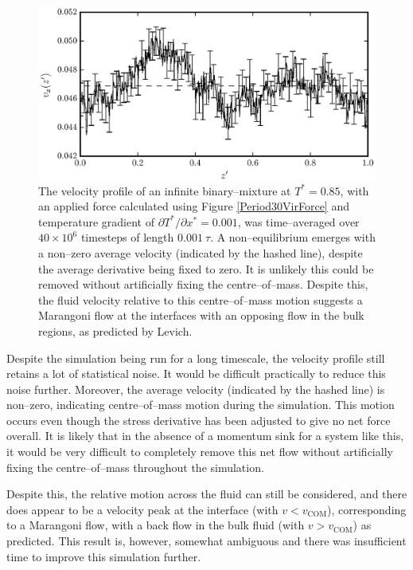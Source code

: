 \begin{figure}[h]
\centering
\includegraphics[scale=0.8]{Period30VirFlow}
\caption{The velocity profile of an infinite binary--mixture at $T^{*}=0.85$, with an applied force calculated using Figure \ref{Period30VirForce} and temperature gradient of $\partial T^{*} / \partial x^{*} = 0.001$, was time--averaged over $40 \times 10^{6}$ timesteps of length $0.001\ \tau$.
A non--equilibrium emerges with a non--zero average velocity (indicated by the hashed line), despite the average derivative being fixed to zero.
It is unlikely this could be removed without artificially fixing the centre--of--mass.
Despite this, the fluid velocity relative to this centre--of--mass motion suggests a Marangoni flow at the interfaces with an opposing flow in the bulk regions, as predicted by Levich.\cite{Levich}
}
\label{Period30VirFlow}
\end{figure}

Despite the simulation being run for a long timescale, the velocity profile still retains a lot of statistical noise.
It would be difficult practically to reduce this noise further.
Moreover, the average velocity (indicated by the hashed line) is non--zero, indicating centre--of--mass motion during the simulation.
This motion occurs even though the stress derivative has been adjusted to give no net force overall.
It is likely that in the absence of a momentum sink for a system like this, it would be very difficult to completely remove this net flow without artificially fixing the centre--of--mass throughout the simulation.

Despite this, the relative motion across the fluid can still be considered, and there does appear to be a velocity peak at the interface (with $v < v_{\mathrm{COM}}$), corresponding to a Marangoni flow, with a back flow in the bulk fluid (with $v > v_{\mathrm{COM}}$) as predicted.
This result is, however, somewhat ambiguous and there was insufficient time to improve this simulation further.


